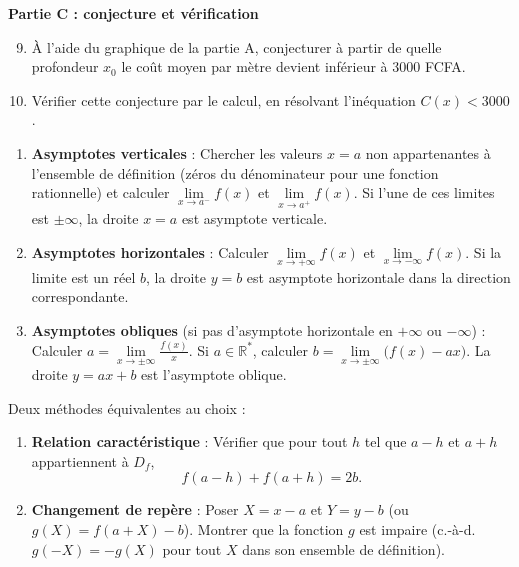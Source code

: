 \documentclass[11pt]{article}
\newcommand{\cle}[1]{{\popxbold\color{popdark}#1}}
\newcounter{popsec}
\newcounter{popsub}
\newcommand{\courssub}[1]{%
  \stepcounter{popsub}%
  \par\vspace{9pt}\noindent{\popxbold\fontsize{11.5}{13}\selectfont\color{popink}{\color{poporange}\thepopsec.\thepopsub}\hspace{6pt}#1}\par\nopagebreak\vspace{4pt}
}
\begin{document}
\textbf{Partie C : conjecture et vérification}
\begin{enumerate}
\setcounter{enumi}{8}
\item À l'aide du graphique de la partie A, conjecturer à partir de quelle profondeur $x_0$ le coût moyen par mètre devient inférieur à \num{3000} FCFA.
\item Vérifier cette conjecture par le calcul, en résolvant l'inéquation $C(x) < \num{3000}$.
\end{enumerate}

\courssub{Ressources à mobiliser}

\begin{methode}
\begin{enumerate}
\item \textbf{Asymptotes verticales} : Chercher les valeurs $x = a$ non appartenantes à l'ensemble de définition (zéros du dénominateur pour une fonction rationnelle) et calculer $\lim\limits_{x \to a^-} f(x)$ et $\lim\limits_{x \to a^+} f(x)$. Si l'une de ces limites est $\pm\infty$, la droite $x = a$ est asymptote verticale.
\item \textbf{Asymptotes horizontales} : Calculer $\lim\limits_{x \to +\infty} f(x)$ et $\lim\limits_{x \to -\infty} f(x)$. Si la limite est un réel $b$, la droite $y = b$ est asymptote horizontale dans la direction correspondante.
\item \textbf{Asymptotes obliques} (si pas d'asymptote horizontale en $+\infty$ ou $-\infty$) : Calculer $a = \lim\limits_{x \to \pm\infty} \frac{f(x)}{x}$. Si $a \in \mathbb{R}^*$, calculer $b = \lim\limits_{x \to \pm\infty} \bigl(f(x) - ax\bigr)$. La droite $y = ax + b$ est l'asymptote oblique.
\end{enumerate}
\end{methode}

\begin{methode}
Deux méthodes équivalentes au choix :
\begin{enumerate}
\item \textbf{Relation caractéristique} : Vérifier que pour tout $h$ tel que $a-h$ et $a+h$ appartiennent à $D_f$,
      \[ f(a-h) + f(a+h) = 2b. \]
\item \textbf{Changement de repère} : Poser $X = x - a$ et $Y = y - b$ (ou $g(X) = f(a+X) - b$). Montrer que la fonction $g$ est \cle{impaire} (c.-à-d. $g(-X) = -g(X)$ pour tout $X$ dans son ensemble de définition).
\end{enumerate}
\end{methode}
\end{document}
